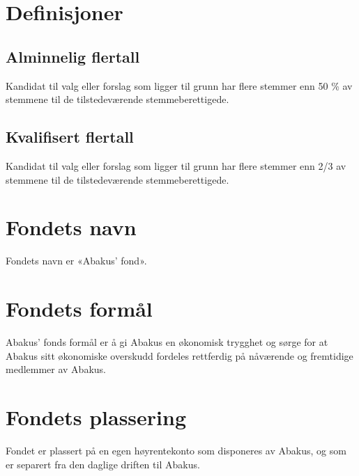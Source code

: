 \section{Definisjoner}

\subsection{Alminnelig flertall}
Kandidat til valg eller forslag som ligger til grunn har flere stemmer enn 50 \%
av stemmene til de tilstedeværende stemmeberettigede.

\subsection{Kvalifisert flertall}
Kandidat til valg eller forslag som ligger til grunn har flere stemmer enn 2/3
av stemmene til de tilstedeværende stemmeberettigede.

\section{Fondets navn}
Fondets navn er «Abakus’ fond».

\section{Fondets formål}
Abakus’ fonds formål er å gi Abakus en økonomisk trygghet og sørge for at Abakus sitt
økonomiske overskudd fordeles rettferdig på nåværende og fremtidige medlemmer av
Abakus.
\section{Fondets plassering}
Fondet er plassert på en egen høyrentekonto som disponeres av Abakus, og som er separert
fra den daglige driften til Abakus.
